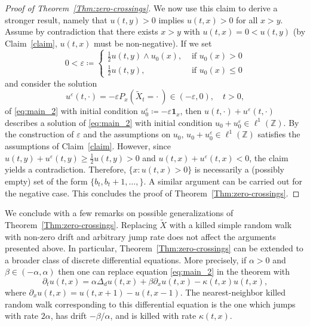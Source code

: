 \documentclass[12pt,reqno,oneside]{amsart}
\numberwithin{equation}{section}
\theoremstyle{definition}
\theoremstyle{remark}
\newcommand{\Z}{\mathbb{Z}}
\newcommand{\bbone}{\boldsymbol 1}
\begin{document}
\begin{proof}[Proof of Theorem~\ref{Thm:zero-crossings}]
  We now use this claim to derive a stronger result, namely that $u(t,y) >0$
  implies $u(t,x) >0$ for all $x>y$. Assume by contradiction that there
  exists $x>y$ with $u(t,x) = 0 < u(t,y)$ (by Claim~\ref{claim}, $u(t,x)$
    must be non-negative). If we set
  \begin{equation*}
    0<\varepsilon \coloneq
    \begin{cases}
      \frac{1}{2}u(t,y)\wedge u_0(x), & \text{ if } u_0(x)> 0 \\
      \frac{1}{2}u(t,y), & \text{ if } u_0(x) \leq 0
    \end{cases}
  \end{equation*}
  and consider the solution
  \begin{equation*}
    u^\varepsilon(t, \cdot)
    =-\varepsilon P_x(\tilde{X}_t= \cdot\ ) \in (-\varepsilon,0), \quad t >0,
  \end{equation*}
  of \eqref{eq:main_2} with initial condition
  $u_0^\varepsilon\coloneq-\varepsilon\bbone_x$, then
  $u(t,\cdot)+u^\varepsilon(t,\cdot)$ describes a solution of
  \eqref{eq:main_2} with initial condition
  $u_0+u_0^\varepsilon \in \ell^1(\Z)$. By the construction of $\varepsilon$
  and the assumptions on $u_0$, $u_0+u_0^\varepsilon \in \ell^1(\Z)$
  satisfies the assumptions of Claim~\ref{claim}. However, since
  $u(t,y)+u^\varepsilon(t,y) \geq \frac{1}{2}u(t,y)>0$ and
  $u(t,x)+u^\varepsilon(t,x) <0$, the claim yields a contradiction.
  Therefore, $\{x: u(t,x)>0\}$ is necessarily a (possibly empty) set of the
  form $\{b_t,b_t+1,\dots,\}$. A similar argument can be carried out for the
  negative case. This concludes the proof of
    Theorem~\ref{Thm:zero-crossings}.
\end{proof}

We conclude with a few remarks on possible generalizations of
Theorem~\ref{Thm:zero-crossings}. Replacing $\tilde{X}$ with a killed simple
random walk with non-zero drift and arbitrary jump rate does not affect the
arguments presented above. In particular, Theorem~\ref{Thm:zero-crossings}
can be extended to a broader class of discrete differential equations. More
precisely, if $\alpha>0$ and $\beta \in (-\alpha,\alpha)$ then one can
replace equation \eqref{eq:main_2} in the theorem with
\begin{equation*}
  \partial_tu(t,x) = \alpha \Delta_d u(t,x)+\beta \partial_xu(t,x)-\kappa(t,x)u(t,x),
\end{equation*}
where $\partial_xu(t,x)=u(t,x+1)-u(t,x-1)$. The nearest-neighbor killed
random walk corresponding to this differential equation is the one which
jumps with rate $2\alpha$, has drift $-\beta/\alpha$, and is killed with
rate $\kappa(t,x)$.
\end{document}
